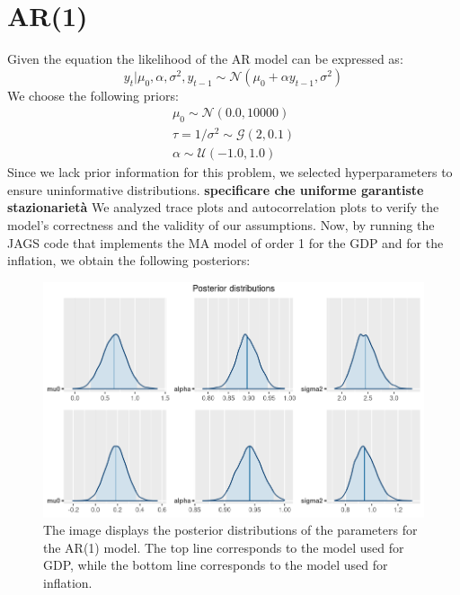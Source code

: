 \section*{AR(1)}
Given the equation  the likelihood of the AR model can be expressed as:
\begin{equation}
    y_{t}|\mu_{0},\alpha,\sigma^2,y_{t-1}\sim \mathcal{N}(\mu_{0} + \alpha y_{t-1}, \sigma^2)
\end{equation}
We choose the following priors:
\begin{equation}
    \begin{split}
        \mu_0 \sim \mathcal{N}(0.0, 10000) \\
        \tau = 1 / \sigma^2 \sim \mathcal{G}(2, 0.1) \\
        \alpha \sim \mathcal{U}(-1.0, 1.0)
    \end{split}
\end{equation}
Since we lack prior information for this problem, we selected hyperparameters to ensure uninformative distributions. \textbf{specificare che uniforme garantiste stazionarietà} We analyzed trace plots and autocorrelation plots to verify the model's correctness and the validity of our assumptions.
Now, by running the JAGS code that implements the MA model of order 1 for the GDP and for the inflation, we obtain the following posteriors: \\
\begin{figure}[h]
    \centering
    \includegraphics[width=\textwidth]{../Images/2-AR/posteriors.png}
    \caption{The image displays the posterior distributions of the parameters for the AR(1) model. The top line corresponds to the model used for GDP, while the bottom line corresponds to the model used for inflation.}
    \label{fig:AR_posteriors}
\end{figure} \\
